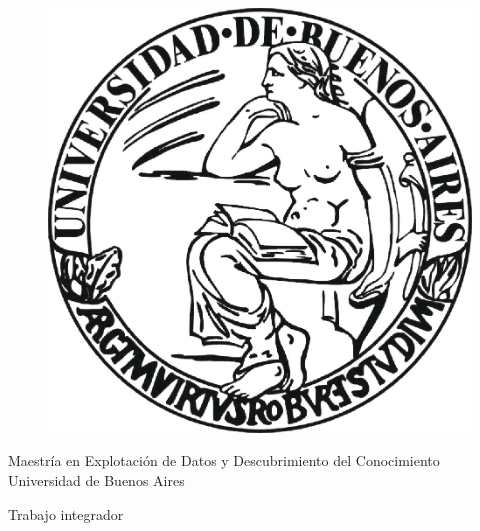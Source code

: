 \documentclass[10 pt]{article}
\begin{document}
\listoftodos

\begin{titlepage}

    \begin{center}
    \vspace*{-0.5in}
    \begin{figure}[htb]
    \begin{center}
    \includegraphics[scale=.3]{images/uba2.jpg}
    \end{center}
    \end{figure}
    
    \begin{large}
    Maestría en Explotación de Datos y Descubrimiento del Conocimiento\\
    \vspace*{0.15in}
    Universidad de Buenos Aires \\
    
    \vspace*{0.6in}
    \end{large}
    
    \begin{large}
    Trabajo integrador\\
    
    
    \end{large}
    \vspace*{0.2in}
    \vspace*{0.3in}
    

\end{center}
\end{titlepage}
\end{document}
